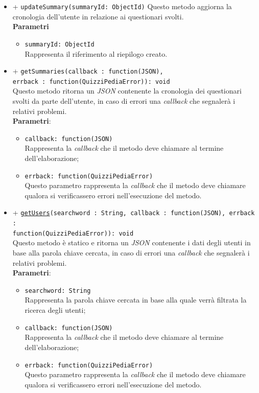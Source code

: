 \begin{itemize}
\begin{itemize}
\begin{itemize}
			\end{itemize}
		\item	
		+ \texttt{updateSummary(summaryId: ObjectId)}	
		Questo metodo aggiorna la cronologia dell'utente in relazione ai questionari svolti.\\	
		\textbf{Parametri} 
			\begin{itemize}
			\item	
				\texttt{summaryId: ObjectId} \\
				Rappresenta il riferimento al riepilogo creato.
			\end{itemize}
		\item	
		+ \texttt{getSummaries(callback : function(JSON), \\errback : function(QuizziPediaError)): void}\\	
		Questo metodo ritorna un \textit{JSON} contenente la cronologia dei questionari svolti da parte dell'utente, in caso di errori una \textit{callback} che segnalerà i relativi problemi.\\
		\textbf{Parametri}: 
			\begin{itemize}
			\item	
				\texttt{callback: function(JSON)} \\
				Rappresenta la \textit{callback} che il metodo deve chiamare al termine dell'elaborazione;	
			\item	
				\texttt{errback: function(QuizziPediaError)} \\
				Questo parametro rappresenta la \textit{callback} che il metodo deve chiamare qualora si verificassero errori nell'esecuzione del metodo.
			\end{itemize}	
		\item			
		+ \texttt{\underline{getUsers}(searchword : String, callback : function(JSON), errback : \\function(QuizziPediaError)): void}	\\	
		Questo metodo è statico e ritorna un \textit{JSON} contenente i dati degli utenti in base alla parola chiave cercata, in caso di errori una \textit{callback} che segnalerà i relativi problemi.\\
		\textbf{Parametri}: 
			\begin{itemize}
			\item	
				\texttt{searchword: String} \\
				Rappresenta la parola chiave cercata in base alla quale verrà filtrata la ricerca degli utenti;	
			\item	
				\texttt{callback: function(JSON)} \\
				Rappresenta la \textit{callback} che il metodo deve chiamare al termine dell'elaborazione;	
			\item	
				\texttt{errback: function(QuizziPediaError)} \\
				Questo parametro rappresenta la \textit{callback} che il metodo deve chiamare qualora si verificassero errori nell'esecuzione del metodo.		
			\end{itemize}
		\end{itemize}	
\end{itemize}